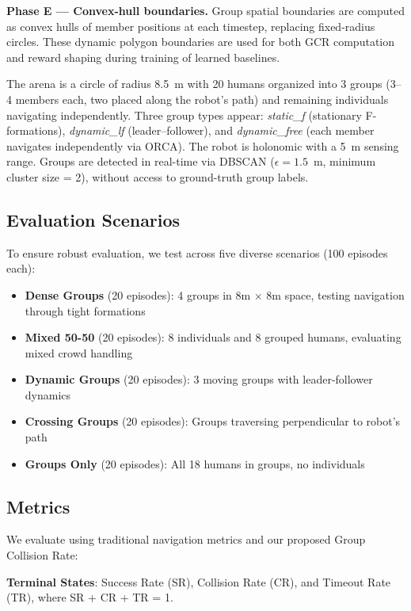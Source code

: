 \textbf{Phase E — Convex-hull boundaries.}
Group spatial boundaries are computed as convex hulls of member positions at each timestep, replacing fixed-radius circles. These dynamic polygon boundaries are used for both GCR computation and reward shaping during training of learned baselines.

The arena is a circle of radius 8.5~m with 20 humans organized into 3 groups (3--4 members each, two placed along the robot's path) and remaining individuals navigating independently. Three group types appear: \textit{static\_f} (stationary F-formations), \textit{dynamic\_lf} (leader--follower), and \textit{dynamic\_free} (each member navigates independently via ORCA). The robot is holonomic with a 5~m sensing range. Groups are detected in real-time via DBSCAN ($\epsilon = 1.5$~m, minimum cluster size = 2), without access to ground-truth group labels.

\subsection{Evaluation Scenarios}
To ensure robust evaluation, we test across five diverse scenarios (100 episodes each):

\begin{itemize}
\item \textbf{Dense Groups} (20 episodes): 4 groups in 8m × 8m space, testing navigation through tight formations
\item \textbf{Mixed 50-50} (20 episodes): 8 individuals and 8 grouped humans, evaluating mixed crowd handling
\item \textbf{Dynamic Groups} (20 episodes): 3 moving groups with leader-follower dynamics
\item \textbf{Crossing Groups} (20 episodes): Groups traversing perpendicular to robot's path
\item \textbf{Groups Only} (20 episodes): All 18 humans in groups, no individuals
\end{itemize}


\subsection{Metrics}
We evaluate using traditional navigation metrics and our proposed Group Collision Rate:

\textbf{Terminal States}: Success Rate (SR), Collision Rate (CR), and Timeout Rate (TR), where SR + CR + TR = 1.


